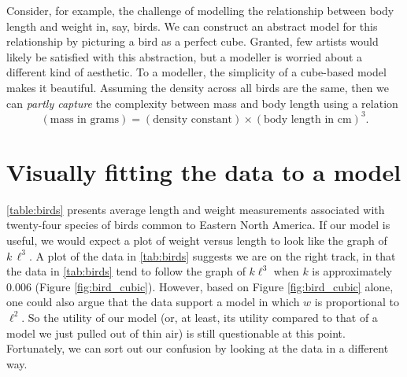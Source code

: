 \documentclass[../book.tex]{subfiles}
\begin{document}
Consider, for example, the challenge of modelling the relationship between body length and weight in, say, birds. We can construct an abstract model for this relationship by picturing a bird as a perfect cube. Granted, few artists would likely be satisfied with this abstraction, but a modeller is worried about a different kind of aesthetic. To a modeller, the simplicity of a cube-based model makes it beautiful. Assuming the density across all birds are the same, then we can \emph{partly capture} the complexity between mass and body length using a relation
\begin{equation}\label{eq:model-mass-length}
(\text{mass in grams}) = (\text{density constant}) \times (\text{body length in cm})^{3}.
\end{equation}

\section{Visually fitting the data to a model}

\cref{table:birds} presents average length and weight measurements associated with twenty-four species of birds common to Eastern North America. If our model is useful, we would expect a plot of weight versus length to look like the graph of \(k\, \ell^3\). A plot of the data in \cref{tab:birds} suggests we are on the right track, in that the data in \cref{tab:birds} tend to follow the graph of \(k\ell^3\) when \(k\) is approximately \(0.006\) (Figure \ref{fig:bird_cubic}). However, based on Figure \ref{fig:bird_cubic} alone, one could also argue that the data support a model in which \(w\) is proportional to \(\ell^2\). So the utility of our model (or, at least, its utility compared to that of a model we just pulled out of thin air) is still questionable at this point. Fortunately, we can sort out our confusion by looking at the data in a different way.
\end{document}
